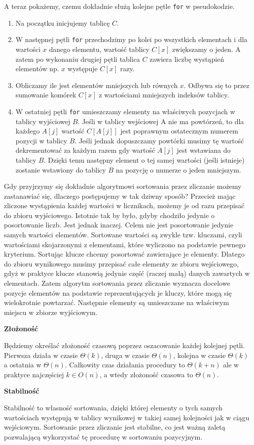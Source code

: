 A teraz pokażemy, czemu dokładnie służą kolejne pętle \texttt{for} w pseudokodzie.

\begin{enumerate}
\item Na początku inicjujemy tablicę $C$.
\item W następnej pętli \texttt{for} przechodzimy po kolei po wszystkich elementach i dla wartości $x$ danego elementu, wartość tablicy $C[x]$ zwiększamy o jeden.
      A zatem po wykonaniu drugiej pętli tablica $C$ zawiera liczbę wystąpień elementów np. $x$ występuje $C[x]$ razy.
\item Obliczamy ile jest elementów mniejszych lub równych $x$. Odbywa się to przez sumowanie komórek $C[x]$ z wartościami mniejszych indeksów tablicy.
\item W ostatniej pętli \texttt{for} umieszczamy elementy na właściwych pozycjach w tablicy wyjściowej $B$.
      Jeśli w tablicy wejściowej A nie ma powtórzeń, to dla każdego $A[j]$ wartość $C[A[j]]$ jest poprawnym ostatecznym numerem pozycji w tablicy $B$.
      Jeśli jednak dopuszczamy powtórki musimy tę wartość dekrementować za każdym razem gdy wartość $A[j]$ jest wstawiana do tablicy $B$.
      Dzięki temu następny element o tej samej wartości (jeśli istnieje) zostanie wstawiony do tablicy $B$ na pozycję o numerze o jeden mniejszym.
\end{enumerate}

Gdy przyjrzymy się dokładnie algorytmowi sortowania przez zliczanie możemy zastanawiać się, dlaczego postępujemy w tak dziwny sposób?
Przecież mając zliczone wystąpienia każdej wartości w licznikach, możemy je od razu przepisać do zbioru wyjściowego.
Istotnie tak by było, gdyby chodziło jedynie o posortowanie liczb.
Jest jednak inaczej.
Celem nie jest posortowanie jedynie samych wartości elementów.
Sortowane wartości są zwykle tzw. kluczami, czyli wartościami skojarzonymi z elementami, które wyliczono na podstawie pewnego kryterium.
Sortując klucze chcemy posortować zawierające je elementy.
Dlatego do zbioru wynikowego musimy przepisać całe elementy ze zbioru wejściowego, gdyż w praktyce klucze stanowią jedynie część (raczej małą) danych zawartych w elementach.
Zatem algorytm sortowania przez zliczanie wyznacza docelowe pozycje elementów na podstawie reprezentujących je kluczy, które mogą się wielokrotnie powtarzać.
Następnie elementy są umieszczane na właściwym miejscu w zbiorze wyjściowym.

\textbf{Złożoność}

Będziemy określać złożoność czasową poprzez oszacowanie każdej kolejnej pętli.
Pierwsza działa w czasie $\Theta(k)$, druga w czasie $\Theta(n)$, kolejna w czasie $\Theta(k)$ a ostatnia w $\Theta(n)$.
Całkowity czas działania procedury to $\Theta(k+n)$ ale w praktyce najczęściej $k \in O(n)$, a wtedy złożoność czasowa to \textbf{$\Theta(n)$}.

\textbf{Stabilność}

Stabilność to własność sortowania, dzięki której elementy o tych samych wartościach występują w tablicy wynikowej w takiej samej kolejności jak w ciągu wejściowym.
Sortowanie przez zliczanie jest stabilne, co jest ważną zaletą pozwalającą wykorzystać tę procedurę w sortowaniu pozycyjnym.

